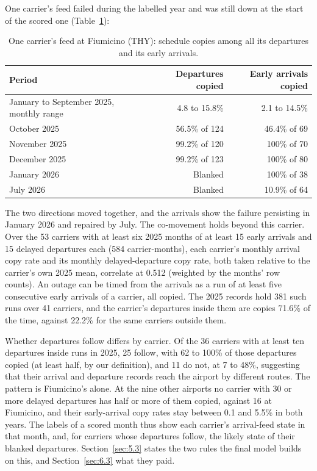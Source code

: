 \documentclass[
  manuscript=article,
  layout=preprint,
  year=2026,
  volume=x,
]{extra/joas}
\begin{document}
One carrier's feed failed during the labelled year and was still down at the start of the scored one (Table~\ref{tab:7}):

\begin{table}[htbp!]
  \centering
  \small
  \setlength{\tabcolsep}{5pt}\renewcommand{\arraystretch}{1.15}
  \caption{One carrier's feed at Fiumicino (THY): schedule copies among all its departures and its early arrivals.}
  \label{tab:7}
  \begin{tabular*}{\linewidth}{@{\extracolsep{\fill}}lrr}
  \toprule
  \textbf{Period} & \textbf{Departures copied} & \textbf{Early arrivals copied} \\
  \midrule
  January to September 2025, monthly range & 4.8 to 15.8\% & 2.1 to 14.5\% \\
  October 2025 & 56.5\% of 124 & 46.4\% of 69 \\
  November 2025 & 99.2\% of 120 & 100\% of 70 \\
  December 2025 & 99.2\% of 123 & 100\% of 80 \\
  January 2026 & Blanked & \cellcolor{recordtint}100\% of 38 \\
  July 2026 & Blanked & \cellcolor{measuredtint}10.9\% of 64 \\
  \bottomrule
  \end{tabular*}
\end{table}

The two directions moved together, and the arrivals show the failure persisting in January 2026 and repaired by July. The co-movement holds beyond this carrier. Over the 53 carriers with at least six 2025 months of at least 15 early arrivals and 15 delayed departures each (584 carrier-months), each carrier's monthly arrival copy rate and its monthly delayed-departure copy rate, both taken relative to the carrier's own 2025 mean, correlate at 0.512 (weighted by the months' row counts). An outage can be timed from the arrivals as a run of at least five consecutive early arrivals of a carrier, all copied. The 2025 records hold 381 such runs over 41 carriers, and the carrier's departures inside them are copies 71.6\% of the time, against 22.2\% for the same carriers outside them.

Whether departures follow differs by carrier. Of the 36 carriers with at least ten departures inside runs in 2025, 25 follow, with 62 to 100\% of those departures copied (at least half, by our definition), and 11 do not, at 7 to 48\%, suggesting that their arrival and departure records reach the airport by different routes. The pattern is Fiumicino's alone. At the nine other airports no carrier with 30 or more delayed departures has half or more of them copied, against 16 at Fiumicino, and their early-arrival copy rates stay between 0.1 and 5.5\% in both years. The labels of a scored month thus show each carrier's arrival-feed state in that month, and, for carriers whose departures follow, the likely state of their blanked departures. Section~\ref{sec:5.3} states the two rules the final model builds on this, and Section~\ref{sec:6.3} what they paid.
\end{document}
